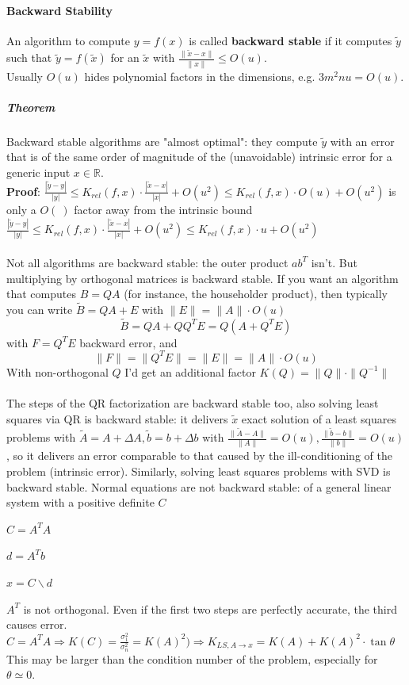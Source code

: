 \documentclass[10pt]{report}
\begin{document}
\paragraph{Backward Stability} An algorithm to compute $y=f(x)$ is called \textbf{backward stable} if it computes $\tilde{y}$ such that $\tilde{y}=f(\tilde{x})$ for an $\tilde{x}$ with $\frac{\|\tilde{x}-x\|}{\|x\|}\leq O(u)$.\\
Usually $O(u)$ hides polynomial factors in the dimensions, e.g. $3m^2nu = O(u)$.
\subparagraph{Theorem} Backward stable algorithms are "almost optimal": they compute $\tilde{y}$ with an error that is of the same order of magnitude of the (unavoidable) intrinsic error for a generic input $x\in \mathbb{R}$.\\
\textbf{Proof}: $\frac{|\tilde{y}-y|}{|y|}\leq K_{rel}(f,x)\cdot\frac{|\tilde{x}-x|}{|x|} + O(u^2)\leq K_{rel}(f,x)\cdot O(u) + O(u^2)$ is only a $O(\:)$ factor away from the intrinsic bound $\frac{|\tilde{y}-y|}{|y|}\leq K_{rel}(f,x)\cdot\frac{|\tilde{x}-x|}{|x|} + O(u^2)\leq K_{rel}(f,x)\cdot u + O(u^2)$\\\\
Not all algorithms are backward stable: the outer product $ab^T$ isn't. But multiplying by orthogonal matrices is backward stable. If you want an algorithm that computes $B=QA$ (for instance, the householder product), then typically you can write $\tilde{B} = QA + E$ with $\|E\|=\|A\|\cdot O(u)$
$$\tilde{B} = QA + QQ^TE = Q(A+Q^TE)$$ with $F = Q^TE$ backward error, and $$\|F\|=\|Q^TE\|=\|E\|=\|A\|\cdot O(u)$$
With non-orthogonal $Q$ I'd get an additional factor $K(Q) = \|Q\|\cdot\|Q^{-1}\|$\\\\
The steps of the QR factorization are backward stable too, also solving least squares via QR is backward stable: it delivers $\tilde{x}$ exact solution of a least squares problems with $\tilde{A} = A +\Delta A, \tilde{b} = b+\Delta b$ with $\frac{\|\tilde{A}-A\|}{\|A\|}=O(u),\frac{\|\tilde{b}-b\|}{\|b\|}=O(u)$, so it delivers an error comparable to that caused by the ill-conditioning of the problem (intrinsic error). Similarly, solving least squares problems with SVD is backward stable.
Normal equations are not backward stable: of a general linear system with a positive definite $C$ \begin{list}{}{}
	\item $C = A^TA$
	\item $d = A^Tb$
	\item $x = C \backslash d$
\end{list}
$A^T$ is not orthogonal. Even if the first two steps are perfectly accurate, the third causes error.
$C=A^TA\Rightarrow K(C) = \frac{\sigma_1^2}{\sigma_n^2} = K(A)^2) \Rightarrow K_{LS,A\rightarrow x} = K(A)+K(A)^2\cdot\tan\theta$\\
This may be larger than the condition number of the problem, especially for $\theta\simeq 0$.
\end{document}
